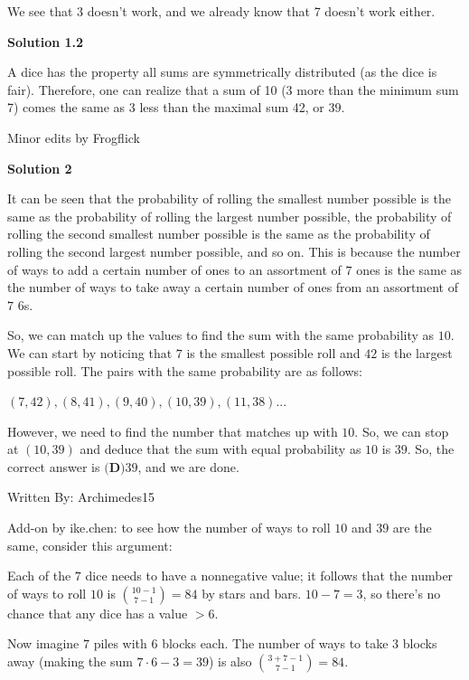\begin{enumerate}
 We see that 3 doesn't work, and we already know that 7 doesn't work either.

 



\textbf{Solution 1.2}

A dice has the property all sums are symmetrically distributed (as the dice is fair). Therefore, one can realize that a sum of 10 (3 more than the minimum sum 7) comes the same as 3 less than the maximal sum 42, or $\boxed{39}$.

 Minor edits by Frogflick

 



\textbf{Solution 2}

It can be seen that the probability of rolling the smallest number possible is the same as the probability of rolling the largest number possible, the probability of rolling the second smallest number possible is the same as the probability of rolling the second largest number possible, and so on. This is because the number of ways to add a certain number of ones to an assortment of $7$ ones is the same as the number of ways to take away a certain number of ones from an assortment of $7$ $6$s.

 So, we can match up the values to find the sum with the same probability as $10$. We can start by noticing that $7$ is the smallest possible roll and $42$ is the largest possible roll. The pairs with the same probability are as follows:

 $(7, 42), (8, 41), (9, 40), (10, 39), (11, 38)...$

 However, we need to find the number that matches up with $10$. So, we can stop at $(10, 39)$ and deduce that the sum with equal probability as $10$ is $39$. So, the correct answer is $\boxed{\textbf{(D)} \text{39}}$, and we are done.

 Written By: Archimedes15

 


 Add-on by ike.chen: to see how the number of ways to roll $10$ and $39$ are the same, consider this argument:

 Each of the $7$ dice needs to have a nonnegative value; it follows that the number of ways to roll $10$ is $\binom {10-1}{7-1}=84$ by stars and bars. $10-7=3$, so there's no chance that any dice has a value $>6$.

 Now imagine $7$ piles with $6$ blocks each. The number of ways to take $3$ blocks away (making the sum $7\cdot 6-3=39$) is also $\binom {3+7-1}{7-1}=84$.


\end{enumerate}
